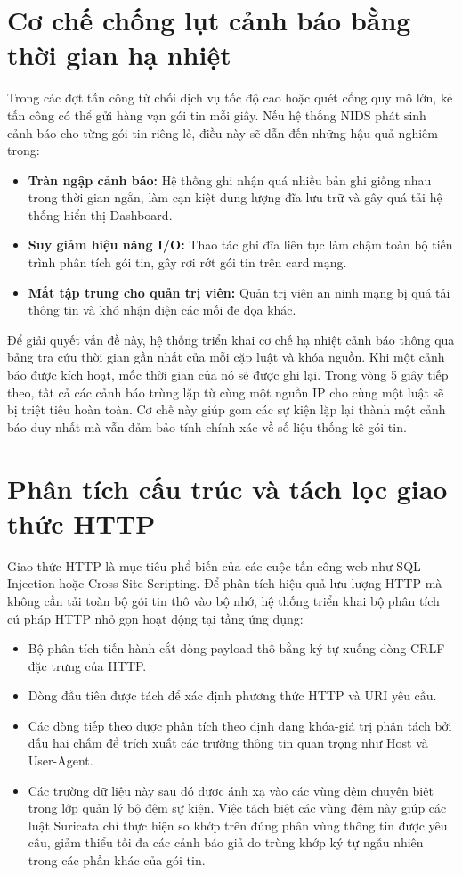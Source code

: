 \section{Cơ chế chống lụt cảnh báo bằng thời gian hạ nhiệt}
Trong các đợt tấn công từ chối dịch vụ tốc độ cao hoặc quét cổng quy mô lớn, kẻ tấn công có thể gửi hàng vạn gói tin mỗi giây. Nếu hệ thống NIDS phát sinh cảnh báo cho từng gói tin riêng lẻ, điều này sẽ dẫn đến những hậu quả nghiêm trọng:
\begin{itemize}
    \item \textbf{Tràn ngập cảnh báo:} Hệ thống ghi nhận quá nhiều bản ghi giống nhau trong thời gian ngắn, làm cạn kiệt dung lượng đĩa lưu trữ và gây quá tải hệ thống hiển thị Dashboard.
    \item \textbf{Suy giảm hiệu năng I/O:} Thao tác ghi đĩa liên tục làm chậm toàn bộ tiến trình phân tích gói tin, gây rơi rớt gói tin trên card mạng.
    \item \textbf{Mất tập trung cho quản trị viên:} Quản trị viên an ninh mạng bị quá tải thông tin và khó nhận diện các mối đe dọa khác.
\end{itemize}
Để giải quyết vấn đề này, hệ thống triển khai cơ chế hạ nhiệt cảnh báo thông qua bảng tra cứu thời gian gần nhất của mỗi cặp luật và khóa nguồn. Khi một cảnh báo được kích hoạt, mốc thời gian của nó sẽ được ghi lại. Trong vòng 5 giây tiếp theo, tất cả các cảnh báo trùng lặp từ cùng một nguồn IP cho cùng một luật sẽ bị triệt tiêu hoàn toàn. Cơ chế này giúp gom các sự kiện lặp lại thành một cảnh báo duy nhất mà vẫn đảm bảo tính chính xác về số liệu thống kê gói tin.

\section{Phân tích cấu trúc và tách lọc giao thức HTTP}
Giao thức HTTP là mục tiêu phổ biến của các cuộc tấn công web như SQL Injection hoặc Cross-Site Scripting. Để phân tích hiệu quả lưu lượng HTTP mà không cần tải toàn bộ gói tin thô vào bộ nhớ, hệ thống triển khai bộ phân tích cú pháp HTTP nhỏ gọn hoạt động tại tầng ứng dụng:
\begin{itemize}
    \item Bộ phân tích tiến hành cắt dòng payload thô bằng ký tự xuống dòng CRLF đặc trưng của HTTP.
    \item Dòng đầu tiên được tách để xác định phương thức HTTP và URI yêu cầu.
    \item Các dòng tiếp theo được phân tích theo định dạng khóa-giá trị phân tách bởi dấu hai chấm để trích xuất các trường thông tin quan trọng như Host và User-Agent.
    \item Các trường dữ liệu này sau đó được ánh xạ vào các vùng đệm chuyên biệt trong lớp quản lý bộ đệm sự kiện. Việc tách biệt các vùng đệm này giúp các luật Suricata chỉ thực hiện so khớp trên đúng phân vùng thông tin được yêu cầu, giảm thiểu tối đa các cảnh báo giả do trùng khớp ký tự ngẫu nhiên trong các phần khác của gói tin.
\end{itemize}


